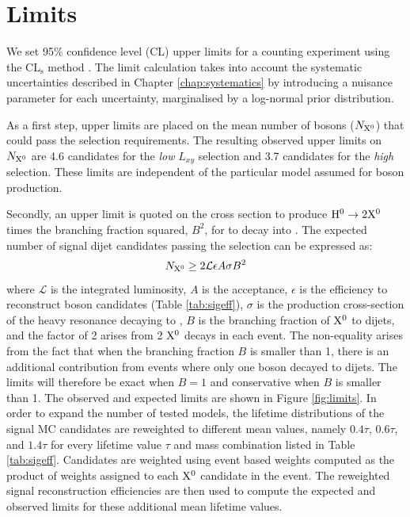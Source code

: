\section{Limits}
\label{sec:limits}

We set 95\% confidence level
(CL) upper limits for a counting experiment
using the CL$_\mathrm{s}$ method \cite{Read:2002hq, Junk:1999kv}. The limit calculation
takes into account the systematic uncertainties described in Chapter 
\ref{chap:systematics} by introducing
a nuisance parameter for each uncertainty, marginalised by a log-normal prior distribution.

As a first step, upper limits are placed on the mean number of \X bosons ($N_\mathrm{X^{0}}$) that could pass
the selection requirements. The resulting observed upper limits on $N_\mathrm{X^{0}}$ are 4.6 candidates
for the {\it low} $L_{xy}$ selection and 3.7 candidates for the {\it high} selection.
 These limits are independent
of the particular model assumed for \X boson production.


Secondly, an upper limit is quoted on the cross section
to produce $\mathrm{H}^{0} \to 2\mathrm{X^{0}}$ times the branching fraction squared, $B^2$, for \X to decay into \qq.
The expected number of signal dijet candidates passing the selection can be expressed as:
\begin{equation}
N_\mathrm{X^{0}} \geq 2 \mathcal{L}\epsilon A\sigma B^2
\end{equation}
where $\mathcal{L}$ is the integrated luminosity, $A$ is the acceptance,
$\epsilon$ is the efficiency to reconstruct \X boson candidates
(Table \ref{tab:sigeff}), $\sigma$ is the production cross-section of the heavy resonance decaying to \X,
$B$ is the branching fraction of $\mathrm{X^{0}}$ to dijets, and the factor of 2 arises from 2 $\mathrm{X^{0}}$ decays in each event.
 The non-equality arises from the fact that when the branching
fraction $B$
is smaller than 1, there is an additional contribution from events where only one \X boson decayed to dijets.
The limits will therefore be exact when $B=1$ and conservative when $B$ is smaller than 1.
The observed and
expected limits are shown in Figure \ref{fig:limits}. In order to expand the number of tested models,
the lifetime distributions of the signal MC candidates are reweighted to
different mean values, namely $0.4\tau$, $0.6\tau$, and $1.4\tau$ for every
lifetime value $\tau$ and mass combination listed
in Table \ref{tab:sigeff}.
Candidates are weighted using event based weights computed as the product
 of weights assigned to each $\mathrm{X^{0}}$ candidate in the event.
The reweighted signal reconstruction efficiencies are then used
to compute the expected and observed limits for these additional mean lifetime values.

